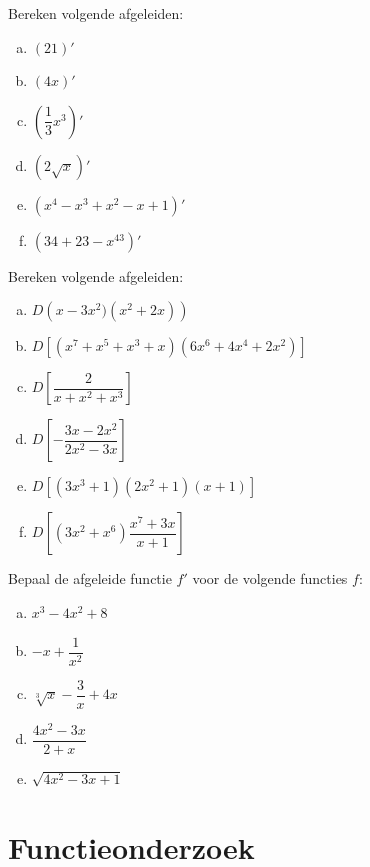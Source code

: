 \documentclass[12pt]{article}
\begin{document}
\begin{oefening}
  Bereken volgende afgeleiden:
  \begin{multicols}{2}
    \begin{enumerate}[(a)]
    \item $\left(21\right)'$
    \item $\left(4x\right)'$
    \item $\left(\dfrac{1}{3}x^3\right)'$
    \item $\left(2\sqrt{x}\right)'$
    \item $\left(x^4-x^3+x^2-x+1\right)'$
    \item $\left(34+23-x^{43}\right)'$
    \end{enumerate}
  \end{multicols}
\end{oefening}

\begin{oefening}
  Bereken volgende afgeleiden:
  \begin{enumerate}[(a)]
  \item $D\left(x-3x^2)(x^2+2x)\right)$
  \item $D\left[(x^7+x^5+x^3+x)(6x^6+4x^4+2x^2)\right]$
  \item $D\left[\dfrac{2}{x+x^2+x^3}\right]$
  \item $D\left[-\dfrac{3x-2x^2}{2x^2-3x}\right]$
  \item $D\left[(3x^3+1)(2x^2+1)(x+1)\right]$
  \item $D\left[(3x^2+x^6)\dfrac{x^7+3x}{x+1}\right]$
  \end{enumerate}
\end{oefening}


\begin{oefening}
  Bepaal de afgeleide functie $f'$ voor de volgende functies $f$:
  \begin{enumerate}[(a)]
  \item $x^3-4x^2+8$
  \item $-x+\dfrac{1}{x^2}$
  \item $\sqrt[3]{x}-\dfrac{3}{x}+4x$
  \item $\dfrac{4x^2-3x}{2+x}$
  \item $\sqrt{4x^2-3x+1}$
  \end{enumerate}
\end{oefening}

\pagebreak
\section{Functieonderzoek}
\end{document}
